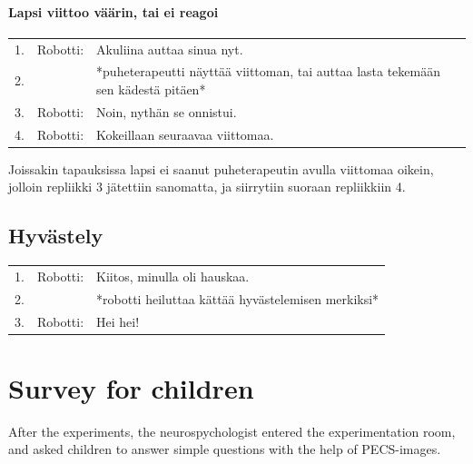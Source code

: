 \subsubsection{Lapsi viittoo väärin, tai ei reagoi}
\begin{tabular}{llp{10cm}}
 1. & Robotti: & Akuliina auttaa sinua nyt.\\
 2. & & *puheterapeutti näyttää viittoman, tai auttaa lasta tekemään sen kädestä pitäen* \\
 3. & Robotti: & Noin, nythän se onnistui.\\
 4. & Robotti: & Kokeillaan seuraavaa viittomaa.  \\
\end{tabular} \hfill \break

Joissakin tapauksissa lapsi ei saanut puheterapeutin avulla viittomaa oikein, jolloin repliikki 3 jätettiin sanomatta, ja siirrytiin suoraan repliikkiin 4.


\section{Hyvästely}


\begin{tabular}{llp{10cm}}
 1. & Robotti: & Kiitos, minulla oli hauskaa.\\
 2. &  & *robotti heiluttaa kättää hyvästelemisen merkiksi*\\
 3. & Robotti: & Hei hei!  \\
\end{tabular}



\chapter{Survey for children}
\label{chapter:children}

After the experiments, the neurospychologist entered the experimentation room, and asked children to answer simple questions with the help of PECS-images.

